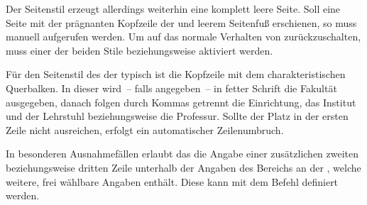 \begin{Declaration}[v2.02]{}
\begin{Declaration}[v2.02]{}
\begin{Declaration}[v2.02]{}
Der Seitenstil  erzeugt allerdings weiterhin eine komplett 
leere Seite. Soll eine Seite mit der prägnanten Kopfzeile der \TnUD und leerem 
Seitenfuß erschienen, so muss  
manuell aufgerufen werden. Um auf das normale Verhalten von \KOMAScript{} 
zurückzuschalten, muss einer der beiden Stile  
beziehungsweise  aktiviert werden.
\end{Declaration}
\end{Declaration}
\end{Declaration}

\begin{Declaration}{}
\begin{Declaration}{}
\begin{Declaration}{}
\begin{Declaration}{}
\begin{Declaration}{}
\printdeclarationlist%
%
%
%
Für den Seitenstil des \CDs der \TnUD typisch ist die Kopfzeile mit dem 
charakteristischen Querbalken. In dieser wird~-- falls angegeben~-- in fetter 
Schrift die Fakultät ausgegeben, danach folgen durch Kommas getrennt die 
Einrichtung, das Institut und der Lehrstuhl beziehungsweise die Professur. 
Sollte der Platz in der ersten Zeile nicht ausreichen, erfolgt ein 
automatischer Zeilenumbruch.

In besonderen Ausnahmefällen erlaubt das \CD die Angabe einer zusätzlichen
zweiten beziehungsweise dritten Zeile unterhalb der Angaben des Bereichs an der 
\TnUD, welche weitere, frei wählbare Angaben enthält. Diese kann mit dem Befehl 
 definiert werden.
\end{Declaration}
\end{Declaration}
\end{Declaration}
\end{Declaration}
\end{Declaration}

